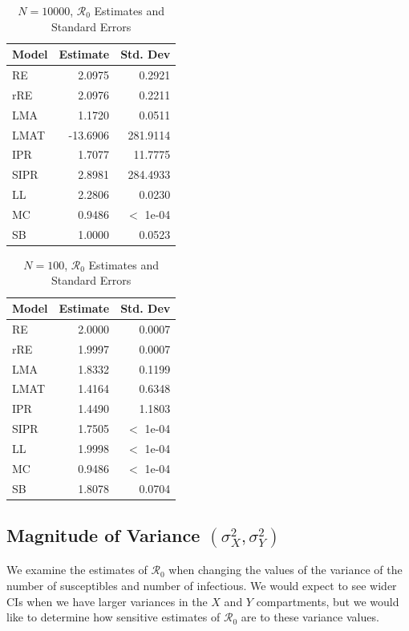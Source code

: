 \documentclass[12pt]{article}
\newcommand{\rr}{\ensuremath{\mathcal{R}_0}}
\begin{document}
\begin{table}[H]
	
	\centering
	\begin{tabular}[t]{l|r|r}
		\hline
		Model & Estimate & Std. Dev\\
		\hline
		RE & 2.0975 & 0.2921\\
		\hline
		rRE & 2.0976 & 0.2211\\
		\hline
		LMA & 1.1720 & 0.0511\\
		\hline
		LMAT & -13.6906 & 281.9114\\
		\hline
		IPR & 1.7077 & 11.7775\\
		\hline
		SIPR & 2.8981 & 284.4933\\
		\hline
		LL & 2.2806 & 0.0230\\
		\hline
		MC & 0.9486 & $<$ 1e-04\\
		\hline
		SB & 1.0000 & 0.0523\\
		\hline
	\end{tabular}
	\caption{$N = 10000$, $\rr$ Estimates and Standard Errors}
\end{table}

\begin{table}[H]
	
	\centering
	\begin{tabular}[t]{l|r|r}
		\hline
		Model & Estimate & Std. Dev\\
		\hline
		RE & 2.0000 & 0.0007\\
		\hline
		rRE & 1.9997 & 0.0007\\
		\hline
		LMA & 1.8332 & 0.1199\\
		\hline
		LMAT & 1.4164 & 0.6348\\
		\hline
		IPR & 1.4490 & 1.1803\\
		\hline
		SIPR & 1.7505 & $<$ 1e-04\\
		\hline
		LL & 1.9998 & $<$ 1e-04\\
		\hline
		MC & 0.9486 & $<$ 1e-04\\
		\hline
		SB & 1.8078 & 0.0704\\
		\hline
	\end{tabular}
	\caption{$N = 100$, $\rr$ Estimates and Standard Errors}
\end{table}

\subsection{Magnitude of Variance $(\sigma^2_X, \sigma^2_Y)$}\label{sec:res-var}
We examine the estimates of $\rr$ when changing the values of the variance of the number of susceptibles and number of infectious.  We would expect to see wider CIs when we have larger variances in the $X$ and $Y$ compartments, but we would like to determine how sensitive estimates of $\rr$ are to these variance values.
\end{document}
